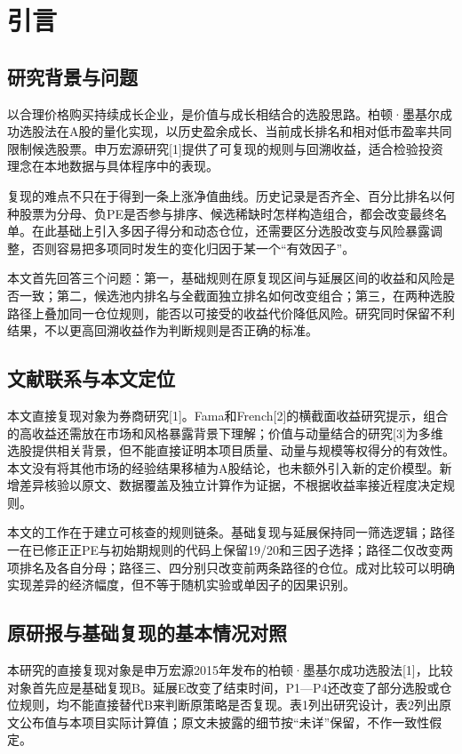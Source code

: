 
\chapter{引言}
\section{研究背景与问题}
以合理价格购买持续成长企业，是价值与成长相结合的选股思路。柏顿·墨基尔成功选股法在A股的量化实现，以历史盈余成长、当前成长排名和相对低市盈率共同限制候选股票。申万宏源研究[1]提供了可复现的规则与回溯收益，适合检验投资理念在本地数据与具体程序中的表现。

复现的难点不只在于得到一条上涨净值曲线。历史记录是否齐全、百分比排名以何种股票为分母、负PE是否参与排序、候选稀缺时怎样构造组合，都会改变最终名单。在此基础上引入多因子得分和动态仓位，还需要区分选股改变与风险暴露调整，否则容易把多项同时发生的变化归因于某一个“有效因子”。

本文首先回答三个问题：第一，基础规则在原复现区间与延展区间的收益和风险是否一致；第二，候选池内排名与全截面独立排名如何改变组合；第三，在两种选股路径上叠加同一仓位规则，能否以可接受的收益代价降低风险。研究同时保留不利结果，不以更高回溯收益作为判断规则是否正确的标准。

\section{文献联系与本文定位}
本文直接复现对象为券商研究[1]。Fama和French[2]的横截面收益研究提示，组合的高收益还需放在市场和风格暴露背景下理解；价值与动量结合的研究[3]为多维选股提供相关背景，但不能直接证明本项目质量、动量与规模等权得分的有效性。本文没有将其他市场的经验结果移植为A股结论，也未额外引入新的定价模型。新增差异核验以原文、数据覆盖及独立计算作为证据，不根据收益率接近程度决定规则。

本文的工作在于建立可核查的规则链条。基础复现与延展保持同一筛选逻辑；路径一在已修正正PE与初始期规则的代码上保留19/20和三因子选择；路径二仅改变两项排名及各自分母；路径三、四分别只改变前两条路径的仓位。成对比较可以明确实现差异的经济幅度，但不等于随机实验或单因子的因果识别。

\section{原研报与基础复现的基本情况对照}
本研究的直接复现对象是申万宏源2015年发布的柏顿·墨基尔成功选股法[1]，比较对象首先应是基础复现B。延展E改变了结束时间，P1—P4还改变了部分选股或仓位规则，均不能直接替代B来判断原策略是否复现。表1列出研究设计，表2列出原文公布值与本项目实际计算值；原文未披露的细节按“未详”保留，不作一致性假定。

